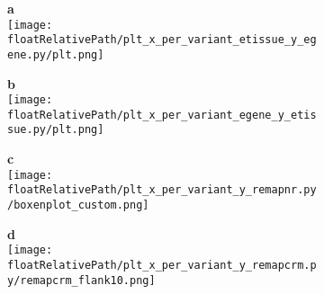 %
%

\begin{figure}[!ht]

    \centering

    \begin{subfigure}[]{.49\textwidth}
        \textbf{a}
        \\
        \texttt{[image: \\floatRelativePath/plt\_x\_per\_variant\_etissue\_y\_egene.py/plt.png]}
    \end{subfigure}
    \begin{subfigure}[]{.49\textwidth}
        \textbf{b}
        \\
        \texttt{[image: \\floatRelativePath/plt\_x\_per\_variant\_egene\_y\_etissue.py/plt.png]}
    \end{subfigure}


    \begin{subfigure}[]{.49\textwidth}
        \textbf{c}
        \\
        \texttt{[image: \\floatRelativePath/plt\_x\_per\_variant\_y\_remapnr.py/boxenplot\_custom.png]}
    \end{subfigure}
    \begin{subfigure}[]{.49\textwidth}
        \textbf{d}
        \\
        \texttt{[image: \\floatRelativePath/plt\_x\_per\_variant\_y\_remapcrm.py/remapcrm\_flank10.png]}
    \end{subfigure}

    \caption{}

\end{figure}


